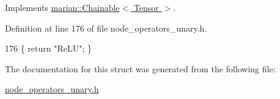 Implements \hyperlink{classmarian_1_1Chainable_a2b7a5cbdac7a7d3bd7d781a6ff148fc3}{marian\+::\+Chainable$<$ Tensor $>$}.



Definition at line 176 of file node\+\_\+operators\+\_\+unary.\+h.


\begin{DoxyCode}
176 \{ \textcolor{keywordflow}{return} \textcolor{stringliteral}{"ReLU"}; \}
\end{DoxyCode}


The documentation for this struct was generated from the following file\+:\begin{DoxyCompactItemize}
\item 
\hyperlink{node__operators__unary_8h}{node\+\_\+operators\+\_\+unary.\+h}\end{DoxyCompactItemize}
